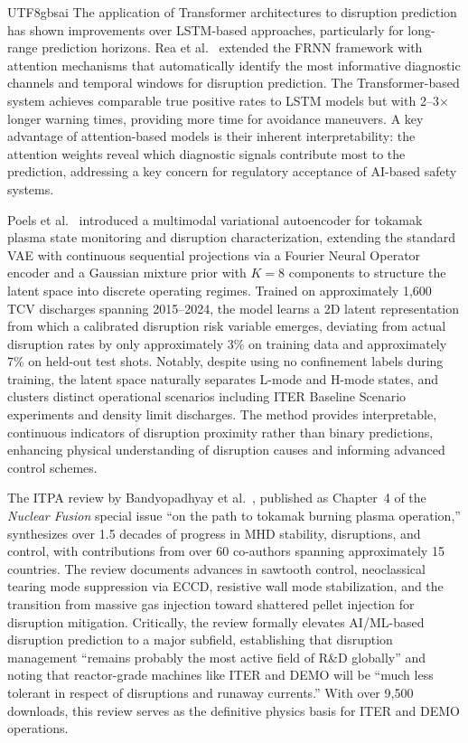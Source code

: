 \documentclass[12pt,a4paper]{article}
\begin{document}
\begin{CJK}{UTF8}{gbsai}
The application of Transformer architectures to disruption prediction has shown improvements over LSTM-based approaches, particularly for long-range prediction horizons. Rea et al.~\citep{Rea2025} extended the FRNN framework with attention mechanisms that automatically identify the most informative diagnostic channels and temporal windows for disruption prediction. The Transformer-based system achieves comparable true positive rates to LSTM models but with 2--3$\times$ longer warning times, providing more time for avoidance maneuvers. A key advantage of attention-based models is their inherent interpretability: the attention weights reveal which diagnostic signals contribute most to the prediction, addressing a key concern for regulatory acceptance of AI-based safety systems.

Poels et al.~\citep{Poels2025VAE} introduced a multimodal variational autoencoder for tokamak plasma state monitoring and disruption characterization, extending the standard VAE with continuous sequential projections via a Fourier Neural Operator encoder and a Gaussian mixture prior with $K=8$ components to structure the latent space into discrete operating regimes. Trained on approximately 1,600 TCV discharges spanning 2015--2024, the model learns a 2D latent representation from which a calibrated disruption risk variable emerges, deviating from actual disruption rates by only approximately 3\% on training data and approximately 7\% on held-out test shots. Notably, despite using no confinement labels during training, the latent space naturally separates L-mode and H-mode states, and clusters distinct operational scenarios including ITER Baseline Scenario experiments and density limit discharges. The method provides interpretable, continuous indicators of disruption proximity rather than binary predictions, enhancing physical understanding of disruption causes and informing advanced control schemes.

The ITPA review by Bandyopadhyay et al.~\citep{Bandyopadhyay2025}, published as Chapter~4 of the \textit{Nuclear Fusion} special issue ``on the path to tokamak burning plasma operation,'' synthesizes over 1.5 decades of progress in MHD stability, disruptions, and control, with contributions from over 60 co-authors spanning approximately 15 countries. The review documents advances in sawtooth control, neoclassical tearing mode suppression via ECCD, resistive wall mode stabilization, and the transition from massive gas injection toward shattered pellet injection for disruption mitigation. Critically, the review formally elevates AI/ML-based disruption prediction to a major subfield, establishing that disruption management ``remains probably the most active field of R\&D globally'' and noting that reactor-grade machines like ITER and DEMO will be ``much less tolerant in respect of disruptions and runaway currents.'' With over 9,500 downloads, this review serves as the definitive physics basis for ITER and DEMO operations.


\end{CJK}
\end{document}
